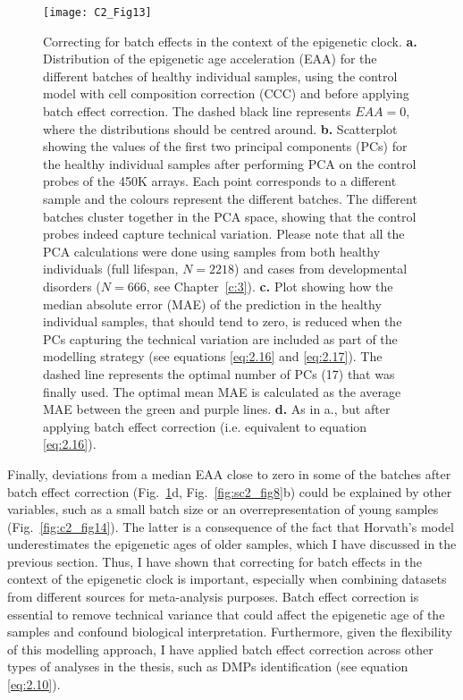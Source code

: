 \begin{figure}[htbp!] 
	\centering
	\texttt{[image: C2\_Fig13]}
	\vspace*{2mm}    
	\caption[Correcting for batch effects in the context of the epigenetic clock]{Correcting for batch effects in the context of the epigenetic clock. \textbf{a.} Distribution of the epigenetic age acceleration (EAA) for the different batches of healthy individual samples, using the control model with cell composition correction (CCC) and before applying batch effect correction. The dashed black line represents $EAA = 0$, where the distributions should be centred around. \textbf{b.} Scatterplot showing the values of the first two principal components (PCs) for the healthy individual samples after performing PCA on the control probes of the 450K arrays. Each point corresponds to a different sample and the colours represent the different batches. The different batches cluster together in the PCA space, showing that the control probes indeed capture technical variation. Please note that all the PCA calculations were done using samples from both healthy individuals (full lifespan, $N=2218$) and cases from developmental disorders ($N=666$, see Chapter~\ref{c:3}). \textbf{c.} Plot showing how the median absolute error (MAE) of the prediction in the healthy individual samples, that should tend to zero, is reduced when the PCs capturing the technical variation are included as part of the modelling strategy (see equations \ref{eq:2.16} and \ref{eq:2.17}). The dashed line represents the optimal number of PCs (17) that was finally used. The optimal mean MAE is calculated as the average MAE between the green and purple lines. \textbf{d.} As in a., but after applying batch effect correction (i.e. equivalent to equation \ref{eq:2.16}).}
	\label{fig:c2_fig13}
\end{figure}

\bigskip

Finally, deviations from a median EAA close to zero in some of the batches after batch effect correction (Fig.~\ref{fig:c2_fig13}d, Fig.~\ref{fig:sc2_fig8}b) could be explained by other variables, such as a small batch size or an overrepresentation of young samples (Fig.~\ref{fig:c2_fig14}). The latter is a consequence of the fact that Horvath’s model underestimates the epigenetic ages of older samples, which I have discussed in the previous section. Thus, I have shown that correcting for batch effects in the context of the epigenetic clock is important, especially when combining datasets from different sources for meta-analysis purposes. Batch effect correction is essential to remove technical variance that could affect the epigenetic age of the samples and confound biological interpretation. Furthermore, given the flexibility of this modelling approach, I have applied batch effect correction across other types of analyses in the thesis, such as DMPs identification (see equation \ref{eq:2.10}).

